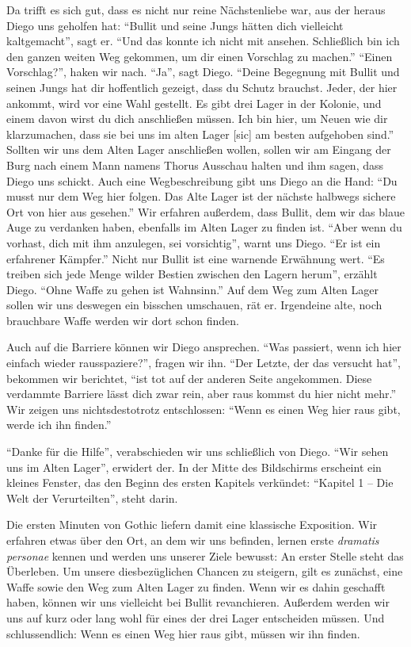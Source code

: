 \documentclass[a5paper,pagesize,numbers=noenddot]{scrbook}
\begin{document}
Da trifft es sich gut, dass es nicht nur reine Nächstenliebe war, aus der heraus Diego uns geholfen hat:
\enquote{Bullit und seine Jungs hätten dich vielleicht kaltgemacht}, sagt er.
\enquote{Und das konnte ich nicht mit ansehen.
Schließlich bin ich den ganzen weiten Weg gekommen, um dir einen Vorschlag zu machen.}
\enquote{Einen Vorschlag?}, haken wir nach.
\enquote{Ja}, sagt Diego.
\enquote{Deine Begegnung mit Bullit und seinen Jungs hat dir hoffentlich gezeigt, dass du Schutz brauchst.
Jeder, der hier ankommt, wird vor eine Wahl gestellt.
Es gibt drei Lager in der Kolonie, und einem davon wirst du dich anschließen müssen.
Ich bin hier, um Neuen wie dir klarzumachen, dass sie bei uns im alten Lager [sic] am besten aufgehoben sind.}
Sollten wir uns dem Alten Lager anschließen wollen, sollen wir am Eingang der Burg nach einem Mann namens Thorus Ausschau halten und ihm sagen, dass Diego uns schickt.
Auch eine Wegbeschreibung gibt uns Diego an die Hand:
\enquote{Du musst nur dem Weg hier folgen.
Das Alte Lager ist der nächste halbwegs sichere Ort von hier aus gesehen.}
Wir erfahren außerdem, dass Bullit, dem wir das blaue Auge zu verdanken haben, ebenfalls im Alten Lager zu finden ist.
\enquote{Aber wenn du vorhast, dich mit ihm anzulegen, sei vorsichtig}, warnt uns Diego.
\enquote{Er ist ein erfahrener Kämpfer.}
Nicht nur Bullit ist eine warnende Erwähnung wert.
\enquote{Es treiben sich jede Menge wilder Bestien zwischen den Lagern herum}, erzählt Diego.
\enquote{Ohne Waffe zu gehen ist Wahnsinn.}
Auf dem Weg zum Alten Lager sollen wir uns deswegen ein bisschen umschauen, rät er.
Irgendeine alte, noch brauchbare Waffe werden wir dort schon finden.

Auch auf die Barriere können wir Diego ansprechen.
\enquote{Was passiert, wenn ich hier einfach wieder rausspaziere?}, fragen wir ihn.
\enquote{Der Letzte, der das versucht hat}, bekommen wir berichtet, \enquote{ist tot auf der anderen Seite angekommen.
Diese verdammte Barriere lässt dich zwar rein, aber raus kommst du hier nicht mehr.}
Wir zeigen uns nichtsdestotrotz entschlossen:
\enquote{Wenn es einen Weg hier raus gibt, werde ich ihn finden.}

\enquote{Danke für die Hilfe}, verabschieden wir uns schließlich von Diego.
\enquote{Wir sehen uns im Alten Lager}, erwidert der.
In der Mitte des Bildschirms erscheint ein kleines Fenster, das den Beginn des ersten Kapitels verkündet:
\enquote{Kapitel 1 -- Die Welt der Verurteilten}, steht darin.

Die ersten Minuten von Gothic liefern damit eine klassische Exposition.
Wir erfahren etwas über den Ort, an dem wir uns befinden, lernen erste \textit{dramatis personae} kennen und werden uns unserer Ziele bewusst:
An erster Stelle steht das Überleben.
Um unsere diesbezüglichen Chancen zu steigern, gilt es zunächst, eine Waffe sowie den Weg zum Alten Lager zu finden.
Wenn wir es dahin geschafft haben, können wir uns vielleicht bei Bullit revanchieren.
Außerdem werden wir uns auf kurz oder lang wohl für eines der drei Lager entscheiden müssen.
Und schlussendlich:
Wenn es einen Weg hier raus gibt, müssen wir ihn finden.
\end{document}
